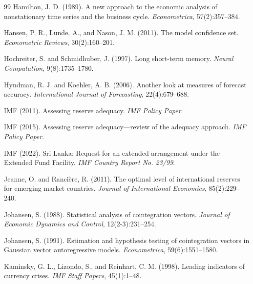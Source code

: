 \documentclass[12pt,a4paper]{article}
\begin{document}
\begin{thebibliography}{99}
Hamilton, J. D. (1989).
\newblock A new approach to the economic analysis of nonstationary time series and the business cycle.
\newblock \textit{Econometrica}, 57(2):357--384.

Hansen, P. R., Lunde, A., and Nason, J. M. (2011).
\newblock The model confidence set.
\newblock \textit{Econometric Reviews}, 30(2):160--201.

Hochreiter, S. and Schmidhuber, J. (1997).
\newblock Long short-term memory.
\newblock \textit{Neural Computation}, 9(8):1735--1780.

Hyndman, R. J. and Koehler, A. B. (2006).
\newblock Another look at measures of forecast accuracy.
\newblock \textit{International Journal of Forecasting}, 22(4):679--688.

IMF (2011).
\newblock Assessing reserve adequacy.
\newblock \textit{IMF Policy Paper}.

IMF (2015).
\newblock Assessing reserve adequacy---review of the adequacy approach.
\newblock \textit{IMF Policy Paper}.

IMF (2022).
\newblock Sri Lanka: Request for an extended arrangement under the Extended Fund Facility.
\newblock \textit{IMF Country Report No. 23/99}.

Jeanne, O. and Ranci\`{e}re, R. (2011).
\newblock The optimal level of international reserves for emerging market countries.
\newblock \textit{Journal of International Economics}, 85(2):229--240.

Johansen, S. (1988).
\newblock Statistical analysis of cointegration vectors.
\newblock \textit{Journal of Economic Dynamics and Control}, 12(2-3):231--254.

Johansen, S. (1991).
\newblock Estimation and hypothesis testing of cointegration vectors in Gaussian vector autoregressive models.
\newblock \textit{Econometrica}, 59(6):1551--1580.

Kaminsky, G. L., Lizondo, S., and Reinhart, C. M. (1998).
\newblock Leading indicators of currency crises.
\newblock \textit{IMF Staff Papers}, 45(1):1--48.


\end{thebibliography}
\end{document}
